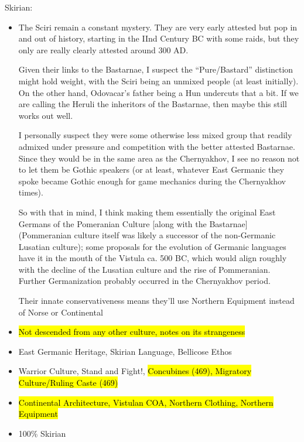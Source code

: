 \documentclass{article}
\begin{document}
	Skirian:
	\begin{itemize}
		\item The Sciri remain a constant mystery. They are very early attested but pop in and out of history, starting in the IInd Century BC with some raids, but they only are really clearly attested around 300 AD. 
		
		Given their links to the Bastarnae, I suspect the “Pure/Bastard” distinction might hold weight, with the Sciri being an unmixed people (at least initially). On the other hand, Odovacar’s father being a Hun undercuts that a bit.
		If we are calling the Heruli the inheritors of the Bastarnae, then maybe this still works out well.
		
		I personally suspect they were some otherwise less mixed group that readily admixed under pressure and competition with the better attested Bastarnae.
		Since they would be in the same area as the Chernyakhov, I see no reason not to let them be Gothic speakers (or at least, whatever East Germanic they spoke became Gothic enough for game mechanics during the Chernyakhov times).
		
		So with that in mind, I think making them essentially the original East Germans of the Pomeranian Culture [along with the Bastarnae] (Pommeranian culture itself was likely a successor of the non-Germanic Lusatian culture); some proposals for the evolution of Germanic languages have it in the mouth of the Vistula ca. 500 BC, which would align roughly with the decline of the Lusatian culture and the rise of Pommeranian.
		Further Germanization probably occurred in the Chernyakhov period.
		
		Their innate conservativeness means they’ll use Northern Equipment instead of Norse or Continental
		\item \hl{Not descended from any other culture, notes on its strangeness}
		\item East Germanic Heritage, Skirian Language, Bellicose Ethos
		\item Warrior Culture, Stand and Fight!, \hl{Concubines (469), Migratory Culture/Ruling Caste (469)}
		\item \hl{Continental Architecture, Vistulan COA, Northern Clothing, Northern Equipment}
		\item 100\% Skirian
	\end{itemize}
	
\end{document}
